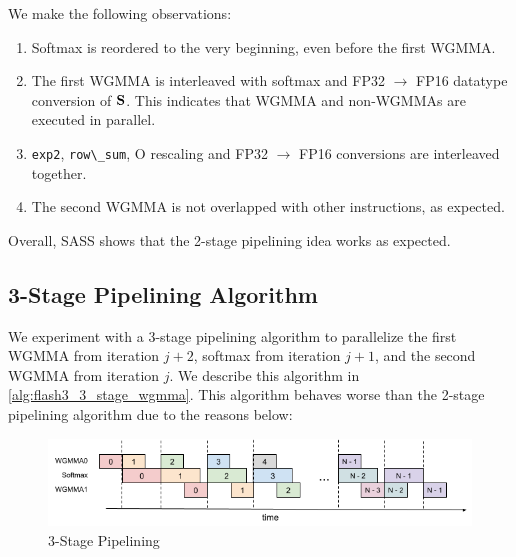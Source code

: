 We make the following observations:
\begin{enumerate}
    \item Softmax is reordered to the very beginning, even before the first WGMMA. 
    \item The first WGMMA is interleaved with softmax and FP32 $\rightarrow$ FP16 datatype conversion of $\mathbf{S}$. This indicates that WGMMA and non-WGMMAs are executed in parallel.
    \item \verb|exp2|, \verb|row\_sum|, O rescaling and FP32 $\rightarrow$ FP16 conversions are interleaved together.  
    \item The second WGMMA is not overlapped with other instructions, as expected.
\end{enumerate}
Overall, SASS shows that the 2-stage pipelining idea works as expected.

\subsection{3-Stage Pipelining Algorithm}
\label{sec:3-stage}
We experiment with a 3-stage pipelining algorithm to parallelize the first WGMMA from iteration $j+2$, softmax from iteration $j+1$, and the second WGMMA from iteration $j$. We describe this algorithm in \cref{alg:flash3_3_stage_wgmma}. 
This algorithm behaves worse than the 2-stage pipelining algorithm due to the reasons below:

\begin{figure}[ht]
    \centering
    \includegraphics[width=.95\linewidth]{figs/3_stage_pipelining.png}
    \caption{3-Stage Pipelining}
    \label{fig:3_stage_pipelining}
\end{figure}

